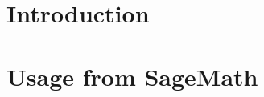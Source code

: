 \documentclass[12pt,twoside,a4paper]{article}
\begin{document}
\maketitle
\thispagestyle{empty}

\begin{abstract}
\ldots
\end{abstract}
\newpage


\newpage

\tableofcontents

\section{Introduction}

\section{Usage from SageMath}
\end{document}
